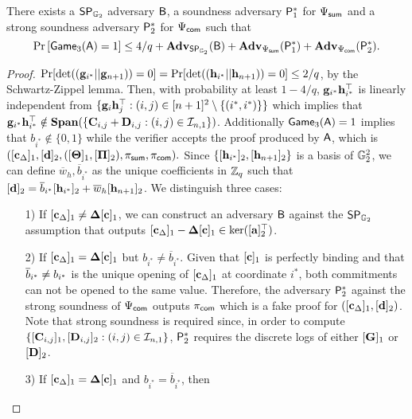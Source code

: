 \begin{lemma} There exists a $\mathsf{SP}_{\mathbb{G}_2}$ adversary $\mathcal{\mathsf{B}}$, a soundness adversary $\mathsf{P}^*_1$  for ${\Psi_{\mathsf{sum}}}$ and 
a strong soundness adversary $\mathsf{P}^*_2$ for ${\Psi_{\mathsf{com}}}$  such that
$$\Pr\left[\mathsf{Game}_3(\mathsf{A})=1\right] \leq 4/q + \mathbf{Adv}_{\mathsf{SP}_{\mathbb{G}_2}}(\mathsf{B}) +
\mathbf{Adv}_{\Psi_{\mathsf{sum}}}(\mathsf{P}^*_1)+\mathbf{Adv}_{\Psi_{\mathsf{com}}}(\mathsf{P}^*_2).$$  
\label{lemma:G3}
\end{lemma}
\begin{proof}
$\Pr[\det((\mathbf{g}_{i^*}||\mathbf{g}_{n+1}))=0]=\Pr[\det((\mathbf{h}_{i^*}||\mathbf{h}_{n+1}))=0]\leq2/q$, by the Schwartz-Zippel lemma. Then, with probability at least $1-4/q$, $\mathbf{g}_{i^*}\mathbf{h}_{i^*}^\top$ is linearly independent from
$\{\mathbf{g}_{i}\mathbf{h}_j^\top:(i,j)\in[n+1]^2\setminus\{(i^*, i^*)\}\}$ which implies that $\mathbf{g}_{i^*}\mathbf{h}_{i^*}^\top\notin\mathbf{Span}(\{\mathbf{{C}}_{i,j}+\mathbf{{D}}_{i,j}:(i,j)\in\mathcal{I}_{n,1}\})$. 
Additionally  $\mathsf{Game}_3(\mathsf{A})=1$ implies that $b_{i^*} \notin \{0,1\}$
while the verifier accepts the proof  produced by $\mathsf{A}$, which is
$ (
        [\mathbf{c}_{\Delta}]_1, [\mathbf{d}]_2,
        ([\mathbf{{\Theta}}]_1, [\mathbf{{\Pi}}]_2), 
        \pi_{\mathsf{sum}},\pi_{\mathsf{com}}
).$ Since $\{[\mathbf{h}_{i^*}]_2,[\mathbf{h}_{n+1}]_2\}$ is a basis of $\mathbb{G}_2^2$,
we can define $\overline{w}_h,\overline{b}_{i^*}$ as the unique coefficients in $\mathbb{Z}_q$ such that $[\mathbf{d}]_2= \overline{b}_{i^*} [\mathbf{h}_{i^*}]_2 + \overline{w}_h [\mathbf{h}_{n+1}]_2$.
We distinguish three cases:
\begin{itemize}
\item[1)] If $[\mathbf{c}_{\Delta}]_1 \neq \mathbf{{\Delta}} [\mathbf{c}]_1$, we can construct an adversary 
$\mathsf{B}$ against the $\mathsf{SP}_{\mathbb{G}_2}$ assumption that outputs 
$[\mathbf{c}_{\Delta}]_1-\mathbf{{\Delta}} [\mathbf{c}]_1\in\ker([\mathbf{{a}}]_2^\top)$.
\item[2)] If $[\mathbf{c}_{\Delta}]_1 = \mathbf{{\Delta}} [\mathbf{c}]_1$ but $b_{i^*} \neq \overline{b}_{i^*}$. Given that $[\mathbf{c}]_1$ is perfectly binding and that $\overline{b}_{i^*}\neq b_{i^*}$ is the unique opening of $[\mathbf{c}_\Delta]_1$ at coordinate $i^*$, both commitments can not be opened to the same value. Therefore, the adversary $\mathsf{P}^*_2$ against the strong soundness of ${\Psi_{\mathsf{com}}}$
outputs $\pi_{\mathsf{com}}$ which is a fake proof for 
$([\mathbf{c}_\Delta]_1,[\mathbf{d}]_2)$. Note that strong soundness is required since, in order to compute $\{[\mathbf{{C}}_{i,j}]_1,[\mathbf{{D}}_{i,j}]_2:(i,j)\in\mathcal{I}_{n,1}\}$, $\mathsf{P}^*_2$ requires the discrete logs of either $[\mathbf{{G}}]_1$ or $[\mathbf{{D}}]_2$.
\item[3)] If $[\mathbf{c}_{\Delta}]_1 = \mathbf{{\Delta}} [\mathbf{c}]_1$ and $b_{i^*} = \overline{b}_{i^*}$, then 

\end{itemize}
\end{proof}

